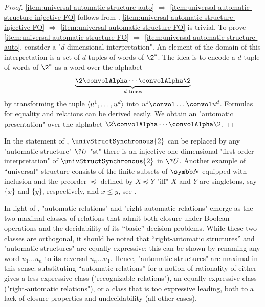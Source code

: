\begin{proof}
	\eqref{item:universal-automatic-structure-auto} $\Rightarrow$
	\eqref{item:universal-automatic-structure-injective-FO} follows from
	.
	\eqref{item:universal-automatic-structure-injective-FO} $\Rightarrow$
	\eqref{item:universal-automatic-structure-FO} is trivial.
	To prove \eqref{item:universal-automatic-structure-FO} $\Rightarrow$
	\eqref{item:universal-automatic-structure-auto}, consider a "$d$-dimensional interpretation".
	An element of the domain of this interpretation is a set of $d$-tuples of words of $\2^*$.
	The idea is to encode a $d$-tuple of words of $\2^*$
	as a word over the alphabet
	\[
		\underbrace{\2 \convolAlpha \cdots \convolAlpha \2}_{
			\text{$d$ times}
		}
	\]
	by transforming the tuple $\langle u^1, \dotsc, u^d\rangle$
	into $u^1 \convol \dotsc \convol u^d$.
	Formulas for equality and relations can be derived easily.
	We obtain an "automatic presentation" over the alphabet
	$\2 \convolAlpha \cdots \convolAlpha \2$.
\end{proof}

In the statement of ,
$\univStructSynchronous{2}$ can be replaced by any "automatic structure" $\?U$
"st" there is an injective one-dimensional "first-order interpretation" of
$\univStructSynchronous{2}$ in $\?U$. 
Another example of ``universal'' structure consists of the finite subsets of $\N$ equipped
with inclusion and the preorder $\preceq$ defined by $X \preceq Y$ "iff" $X$ and $Y$ are 
singletons, say $\{x\}$ and $\{y\}$, respectively, and $x \leq y$,
see \cite[Theorem~XII.2.3]{Blumensath2024MSOModelTheory}.

\begin{remark}
	In light of , "automatic relations"
	and "right-automatic relations" emerge as the two maximal classes of relations
	that admit both closure under Boolean operations and the decidability of
	its ``basic'' decision problems.
	While these two classes are orthogonal, it should be noted that
	``right-automatic structures'' and "automatic structures" are equally expressive:
	this can be shown by renaming any word $u_1\dotsc u_n$ to its reversal $u_n \dotsc u_1$.
	Hence, "automatic structures" are maximal in this sense: substituting ``automatic relations''
	for a notion of rationality of 
	either gives a less expressive class ("recognizable relations"),
	an equally expressive class ("right-automatic relations"),
	or a class that is too expressive leading, both to a lack of closure properties
	and undecidability (all other cases).
\end{remark}

